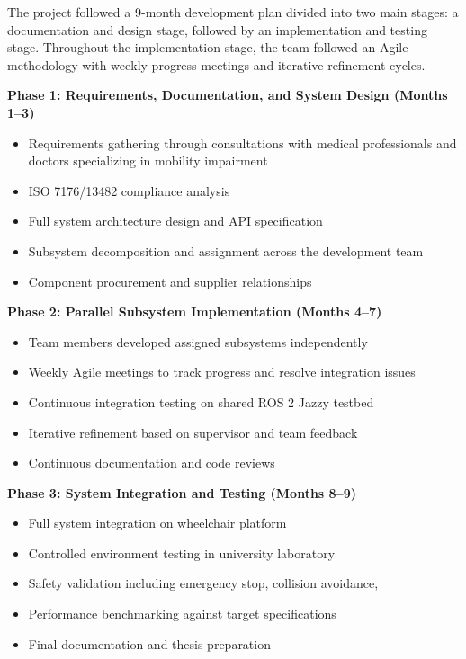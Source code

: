 \documentclass[12pt,a4paper]{report}
\begin{document}
The project followed a 9-month development plan divided into two main stages: a
documentation and design stage, followed by an implementation and testing stage.
Throughout the implementation stage, the team followed an Agile methodology with
weekly progress meetings and iterative refinement cycles.

\textbf{Phase 1: Requirements, Documentation, and System Design (Months 1--3)}
\begin{itemize}[leftmargin=*,itemsep=3pt]
    \item Requirements gathering through consultations with medical professionals
          and doctors specializing in mobility impairment
    \item ISO 7176/13482 compliance analysis
    \item Full system architecture design and API specification
    \item Subsystem decomposition and assignment across the development team
    \item Component procurement and supplier relationships
\end{itemize}

\textbf{Phase 2: Parallel Subsystem Implementation (Months 4--7)}
\begin{itemize}[leftmargin=*,itemsep=3pt]
    \item Team members developed assigned subsystems independently
    \item Weekly Agile meetings to track progress and resolve integration issues
    \item Continuous integration testing on shared ROS 2 Jazzy testbed
    \item Iterative refinement based on supervisor and team feedback
    \item Continuous documentation and code reviews
\end{itemize}

\textbf{Phase 3: System Integration and Testing (Months 8--9)}
\begin{itemize}[leftmargin=*,itemsep=3pt]
    \item Full system integration on wheelchair platform
    \item Controlled environment testing in university laboratory
    \item Safety validation including emergency stop, collision avoidance,
    \item Performance benchmarking against target specifications
    \item Final documentation and thesis preparation
\end{itemize}
\end{document}
